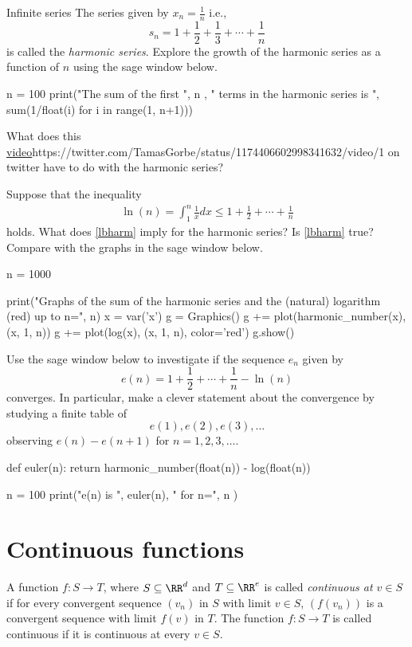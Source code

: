 \documentclass{article}
\begin{document}
\begin{hideinbutton}{Infinite series}
\beginshex
The series given by $x_n = \frac{1}{n}$ i.e.,
$$
s_n = 1 + \frac{1}{2} + \frac{1}{3} + \cdots + \frac{1}{n}
$$
is called the \emph{harmonic series}. Explore the growth of the harmonic series as a function of $n$
using the sage window below.

\begin{sage}
n = 100
print("The sum of the first ", n , " terms in the harmonic series is ", sum(1/float(i) for i in range(1, n+1)))
\end{sage}

What does this \url{video}{https://twitter.com/TamasGorbe/status/1174406602998341632/video/1}
on twitter have to do with the harmonic series?

Suppose that the inequality
\begin{align}\label{lbharm}
\ln(n) = \int_1^n \frac{1}{x} d x \leq 1 + \frac{1}{2} + \cdots + \frac{1}{n}
\end{align}
holds. What does \eqref{lbharm} imply for the harmonic series? Is \eqref{lbharm} true? Compare
with the graphs in the sage window below.

\begin{sage}
n = 1000
  
print("Graphs of the sum of the harmonic series and the (natural) logarithm (red) up to n=", n)
x = var('x')
g = Graphics()
g += plot(harmonic_number(x), (x, 1, n))
g += plot(log(x), (x, 1, n), color='red')
g.show()
\end{sage}

Use the sage window below to investigate if the sequence $e_n$ given by
$$
e(n) = 1 + \frac{1}{2} + \cdots + \frac{1}{n} - \ln(n)
$$
converges. In particular, make a clever statement about the convergence by studying a finite table
of
$$
e(1), e(2), e(3), \dots
$$
observing $e(n) - e(n+1)$ for $n = 1, 2, 3, \dots$.

\begin{sage}
def euler(n):
  return harmonic_number(float(n)) - log(float(n))

n = 100
print("e(n) is ", euler(n), " for n=", n )
\end{sage}
\endshex


\end{hideinbutton}


\section{Continuous functions}

\begin{definition}[emph]\label{defcontfunc}
A function $f: S\rightarrow T$, where $S \subseteq \RR^d$ and $T\subseteq \RR^e$ is
called \emph{continuous at $v\in S$} if for every
convergent sequence $(v_n)$ in $S$ with limit $v\in S$, $(f(v_n))$ is a
convergent sequence with limit $f(v)$ in $T$. The function $f: S\rightarrow T$ is called continuous
if it is continuous at every $v\in S$.
\end{definition}
\end{document}

